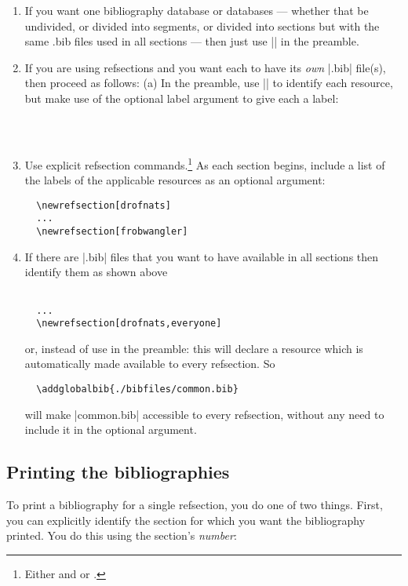 \begin{enumerate}
\item If you want one bibliography database or databases --- whether
  that be undivided, or divided into segments, or divided into
  sections but with the same .bib files used in all sections --- then
  just use || in the preamble.
\item If you are using refsections and you want each to have its
  \emph{own} |.bib| file(s), then proceed as follows: (a) In the
  preamble, use || to identify each resource, but
  make use of the optional label argument to give each a label:
\begin{Verbatim}
  
  
\end{Verbatim}
\item Use explicit refsection commands.\footnote{Either
     and  or
    .} As each section begins, include a list of the
  labels of the applicable resources as an optional argument:
\begin{Verbatim}
  \newrefsection[drofnats]
  ... 
  \newrefsection[frobwangler]
\end{Verbatim}
\item If there are |.bib| files that you want to have available in all
  sections then identify them as shown above
\begin{Verbatim}
  
  ...
  \newrefsection[drofnats,everyone]
\end{Verbatim}
or, instead of  use
 in the preamble: this will
declare a resource which is automatically made available to every
refsection. So
\begin{Verbatim}
  \addglobalbib{./bibfiles/common.bib}
\end{Verbatim} 
will make |common.bib| accessible to every refsection, without any
need to include it in the optional argument.
\end{enumerate}
\subsection{Printing the bibliographies}

To print a bibliography for a single refsection, you do one of two
things. First, you can explicitly identify the section for which you
want the bibliography printed. You do this using the section's
\emph{number}:

